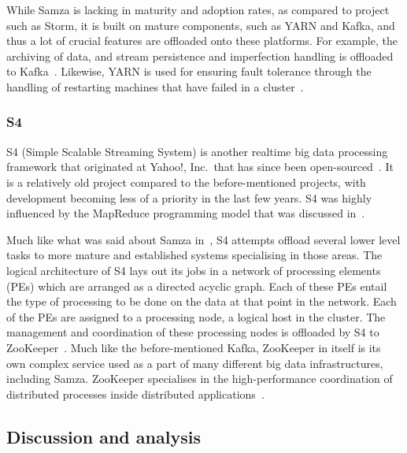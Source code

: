 \documentclass[a4paper,11pt]{article}
\begin{document}
While Samza is lacking in maturity and adoption rates, as compared to project such as Storm, it is built on mature
components, such as YARN and Kafka, and thus a lot of crucial features are offloaded onto these platforms. For example,
the archiving of data, and stream persistence and imperfection handling is offloaded to Kafka~\cite{bockermann2014survey}.
Likewise, YARN is used for ensuring fault tolerance through the handling of restarting machines that have failed in a
cluster~\cite{bockermann2014survey}.


\subsubsection{S4} %
\label{ssub:s4}

S4 (Simple Scalable Streaming System) is another realtime big data processing framework that originated at Yahoo!, Inc.\
that has since been open-sourced~\cite{neumeyer2010s4}. It is a relatively old project compared to the before-mentioned projects,
with development becoming less of a priority in the last few years. S4 was highly influenced by the MapReduce programming
model that was discussed in~\sectref{ssub:mapreduce_and_gfs}.

Much like what was said about Samza in~, S4 attempts offload several lower level tasks to more
mature and established systems specialising in those areas. The logical architecture of S4 lays out its jobs in a
network of processing elements (PEs) which are arranged as a directed acyclic graph. Each of these PEs entail the type
of processing to be done on the data at that point in the network. Each of the PEs are assigned to a processing node, a
logical host in the cluster. The management and coordination of these processing nodes is offloaded by S4 to
ZooKeeper~\cite{kamburugamuve_survey_2014}. Much like the before-mentioned Kafka, ZooKeeper in itself is its own complex
service used as a part of many different big data infrastructures, including Samza. ZooKeeper specialises in the high-performance
coordination of distributed processes inside distributed applications~\cite{hunt2010zookeeper}.



\subsection{Discussion and analysis} %
\label{sub:processing_conclusion}
\end{document}

